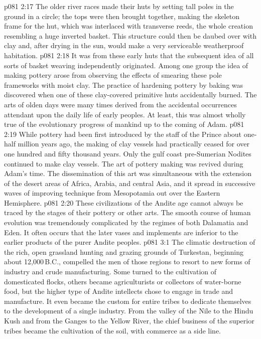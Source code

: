 \vs p081 2:17 The older river races made their huts by setting tall poles in the ground in a circle; the tops were then brought together, making the skeleton frame for the hut, which was interlaced with transverse reeds, the whole creation resembling a huge inverted basket. This structure could then be daubed over with clay and, after drying in the sun, would make a very serviceable weatherproof habitation.
\vs p081 2:18 It was from these early huts that the subsequent idea of all sorts of basket weaving independently originated. Among one group the idea of making pottery arose from observing the effects of smearing these pole frameworks with moist clay. The practice of hardening pottery by baking was discovered when one of these clay\hyp{}covered primitive huts accidentally burned. The arts of olden days were many times derived from the accidental occurrences attendant upon the daily life of early peoples. At least, this was almost wholly true of the evolutionary progress of mankind up to the coming of Adam.
\vs p081 2:19 While pottery had been first introduced by the staff of the Prince about one\hyp{}half million years ago, the making of clay vessels had practically ceased for over one hundred and fifty thousand years. Only the gulf coast pre\hyp{}Sumerian Nodites continued to make clay vessels. The art of pottery making was revived during Adam’s time. The dissemination of this art was simultaneous with the extension of the desert areas of Africa, Arabia, and central Asia, and it spread in successive waves of improving technique from Mesopotamia out over the Eastern Hemisphere.
\vs p081 2:20 These civilizations of the Andite age cannot always be traced by the stages of their pottery or other arts. The smooth course of human evolution was tremendously complicated by the regimes of both Dalamatia and Eden. It often occurs that the later vases and implements are inferior to the earlier products of the purer Andite peoples.
\vs p081 3:1 The climatic destruction of the rich, open grassland hunting and grazing grounds of Turkestan, beginning about 12,000\,B.C., compelled the men of those regions to resort to new forms of industry and crude manufacturing. Some turned to the cultivation of domesticated flocks, others became agriculturists or collectors of water\hyp{}borne food, but the higher type of Andite intellects chose to engage in trade and manufacture. It even became the custom for entire tribes to dedicate themselves to the development of a single industry. From the valley of the Nile to the Hindu Kush and from the Ganges to the Yellow River, the chief business of the superior tribes became the cultivation of the soil, with commerce as a side line.
